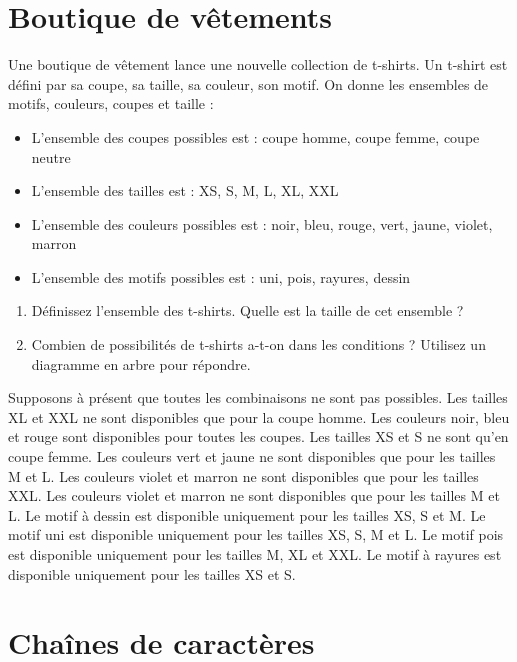 \documentclass[a4paper,11pt]{article}
\begin{document}
\section{Boutique de vêtements}

Une boutique de vêtement lance une nouvelle collection de t-shirts. Un t-shirt est défini par sa coupe, sa taille, sa couleur, son motif. On donne les ensembles de motifs, couleurs, coupes et taille :

\begin{itemize}
\item L'ensemble des coupes possibles est : coupe homme, coupe femme, coupe neutre
\item L'ensemble des tailles est : XS, S, M, L, XL, XXL
\item L'ensemble des couleurs possibles est : noir, bleu, rouge, vert, jaune, violet, marron
\item L'ensemble des motifs possibles est : uni, pois, rayures, dessin
\end{itemize}

\begin{enumerate}
\item Définissez l'ensemble des t-shirts. Quelle est la taille de cet ensemble ?

\item Combien de possibilités de t-shirts a-t-on dans les conditions ? Utilisez un diagramme en arbre pour répondre.
\end{enumerate}

Supposons à présent que toutes les combinaisons ne sont pas possibles. Les tailles XL et XXL ne sont disponibles que pour la coupe homme. Les couleurs noir, bleu et rouge sont disponibles pour toutes les coupes. Les tailles XS et S ne sont qu'en coupe femme. Les couleurs vert et jaune ne sont disponibles que pour les tailles M et L. Les couleurs violet et marron ne sont disponibles que pour les tailles XXL. Les couleurs violet et marron ne sont disponibles que pour les tailles M et L. Le motif à dessin est disponible uniquement pour les tailles XS, S et M. Le motif uni est disponible uniquement pour les tailles XS, S, M et L. Le motif pois est disponible uniquement pour les tailles M, XL et XXL. Le motif à rayures est disponible uniquement pour les tailles XS et S.

\section{Chaînes de caractères}
\end{document}
